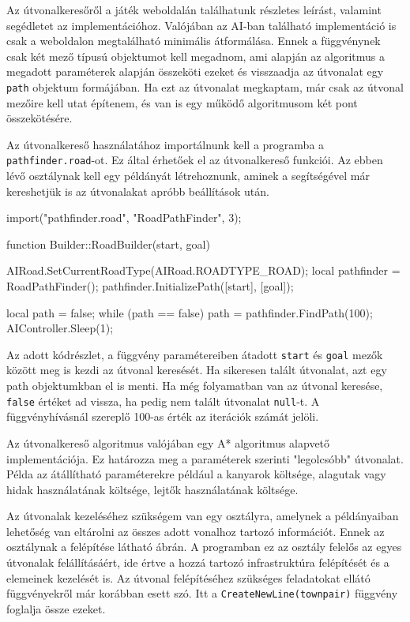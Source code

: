 Az útvonalkeresőről a játék weboldalán találhatunk részletes leírást, valamint segédletet az implementációhoz. Valójában az AI-ban található implementáció is csak a weboldalon megtalálható minimális átformálása. Ennek a függvénynek csak két mező típusú objektumot kell megadnom, ami alapján az algoritmus a megadott paraméterek alapján összeköti ezeket és visszaadja az útvonalat egy \texttt{path} objektum formájában. Ha ezt az útvonalat megkaptam, már csak az útvonal mezőire kell utat építenem, és van is egy működő algoritmusom két pont összekötésére.

Az útvonalkereső használatához importálnunk kell a programba a \\ \texttt{pathfinder.road}-ot. Ez által érhetőek el az útvonalkereső funkciói. Az ebben lévő osztálynak kell egy példányát létrehoznunk, aminek a segítségével már kereshetjük is az útvonalakat apróbb beállítások után.

\begin{cpp}
import("pathfinder.road", "RoadPathFinder", 3);

function Builder::RoadBuilder(start, goal) {
  AIRoad.SetCurrentRoadType(AIRoad.ROADTYPE_ROAD);
  local pathfinder = RoadPathFinder();
  pathfinder.InitializePath([start], [goal]);
  
  local path = false;
  while (path == false) {
    path = pathfinder.FindPath(100);
    AIController.Sleep(1);
  }
}
\end{cpp}

Az adott kódrészlet, a függvény paramétereiben átadott \texttt{start} és \texttt{goal} mezők között meg is kezdi az útvonal keresését. Ha sikeresen talált útvonalat, azt egy path objektumkban el is menti. Ha még folyamatban van az útvonal keresése, \texttt{false} értéket ad vissza, ha pedig nem talált útvonalat \texttt{null}-t. A függvényhívásnál szereplő 100-as érték az iterációk számát jelöli.

Az útvonalkereső algoritmus valójában egy A* algoritmus alapvető implementációja. Ez határozza meg a paraméterek szerinti "legolcsóbb" útvonalat. Példa az átállítható paraméterekre például a kanyarok költsége, alagutak vagy hidak használatának költsége, lejtők használatának költsége.


Az útvonalak kezeléséhez szükségem van egy osztályra, amelynek a példányaiban lehetőség van eltárolni az összes adott vonalhoz tartozó információt. Ennek az osztálynak a felépítése látható  ábrán. A programban ez az osztály felelős az egyes útvonalak felállításáért, ide értve a hozzá tartozó infrastruktúra felépítését és a elemeinek kezelését is. Az útvonal felépítéséhez szükséges feladatokat ellátó függvényekről már korábban esett szó. Itt a \texttt{CreateNewLine(townpair)} függvény foglalja össze ezeket.


